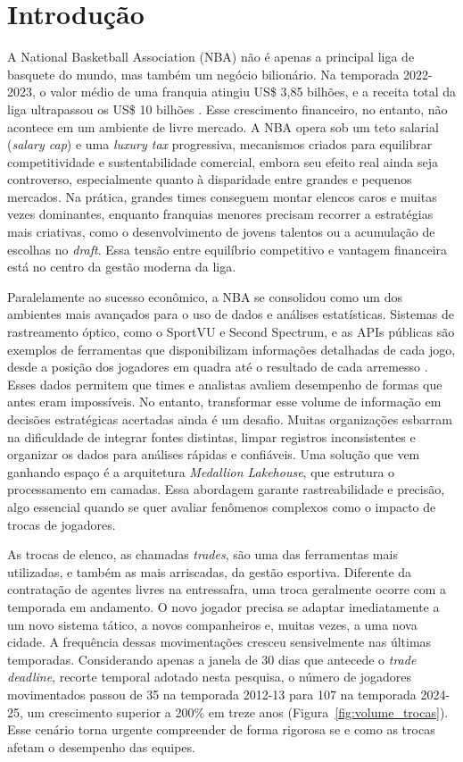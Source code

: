 \chapter{Introdução}
\label{chp:introduction}

A National Basketball Association (NBA) não é apenas a principal liga de basquete do mundo, mas também um negócio bilionário. Na temporada 2022-2023, o valor médio de uma franquia atingiu US\$ 3,85 bilhões, e a receita total da liga ultrapassou os US\$ 10 bilhões \citep{forbes2023}. Esse crescimento financeiro, no entanto, não acontece em um ambiente de livre mercado. A NBA opera sob um teto salarial (\textit{salary cap}) e uma \textit{luxury tax} progressiva, mecanismos criados para equilibrar competitividade e sustentabilidade comercial, embora seu efeito real ainda seja controverso, especialmente quanto à disparidade entre grandes e pequenos mercados. Na prática, grandes times conseguem montar elencos caros e muitas vezes dominantes, enquanto franquias menores precisam recorrer a estratégias mais criativas, como o desenvolvimento de jovens talentos ou a acumulação de escolhas no \textit{draft}. Essa tensão entre equilíbrio competitivo e vantagem financeira está no centro da gestão moderna da liga.

Paralelamente ao sucesso econômico, a NBA se consolidou como um dos ambientes mais avançados para o uso de dados e análises estatísticas. Sistemas de rastreamento óptico, como o SportVU e Second Spectrum, e as APIs públicas são exemplos de ferramentas que disponibilizam informações detalhadas de cada jogo, desde a posição dos jogadores em quadra até o resultado de cada arremesso \citep{oliver2004, goldsberry2019}. Esses dados permitem que times e analistas avaliem desempenho de formas que antes eram impossíveis. No entanto, transformar esse volume de informação em decisões estratégicas acertadas ainda é um desafio. Muitas organizações esbarram na dificuldade de integrar fontes distintas, limpar registros inconsistentes e organizar os dados para análises rápidas e confiáveis. Uma solução que vem ganhando espaço é a arquitetura \textit{Medallion Lakehouse}, que estrutura o processamento em camadas. Essa abordagem garante rastreabilidade e precisão, algo essencial quando se quer avaliar fenômenos complexos como o impacto de trocas de jogadores.

As trocas de elenco, as chamadas \textit{trades}, são uma das ferramentas mais utilizadas, e também as mais arriscadas, da gestão esportiva. Diferente da contratação de agentes livres na entressafra, uma troca geralmente ocorre com a temporada em andamento. O novo jogador precisa se adaptar imediatamente a um novo sistema tático, a novos companheiros e, muitas vezes, a uma nova cidade. A frequência dessas movimentações cresceu sensivelmente nas últimas temporadas. Considerando apenas a janela de 30 dias que antecede o \textit{trade deadline}, recorte temporal adotado nesta pesquisa, o número de jogadores movimentados passou de 35 na temporada 2012-13 para 107 na temporada 2024-25, um crescimento superior a 200\% em treze anos (Figura~\ref{fig:volume_trocas}). Esse cenário torna urgente compreender de forma rigorosa se e como as trocas afetam o desempenho das equipes.

